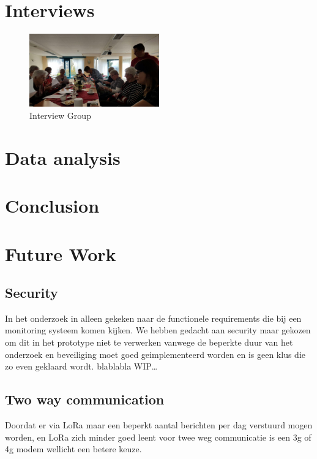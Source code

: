 \documentclass{below-ext}
\begin{document}
\section{Interviews}
\begin{figure}
\center
\label{fig2:interview}
\includegraphics[width=0.5\textwidth]{interview}
\caption{Interview Group}
\end{figure}
\section{Data analysis}
\section{Conclusion}
\section{Future Work}
\subsection{Security}
In het onderzoek in alleen gekeken naar de functionele requirements die bij een monitoring systeem komen kijken. We hebben gedacht aan security maar gekozen om dit in het prototype niet te verwerken vanwege de beperkte duur van het onderzoek en beveiliging moet goed geimplementeerd worden en is geen klus die zo even geklaard wordt. blablabla WIP\ldots
\subsection{Two way communication}
Doordat er via LoRa maar een beperkt aantal berichten per dag verstuurd mogen worden, en LoRa zich minder goed leent voor twee weg communicatie is een 3g of 4g modem wellicht een betere keuze.
\balance


\end{document}

